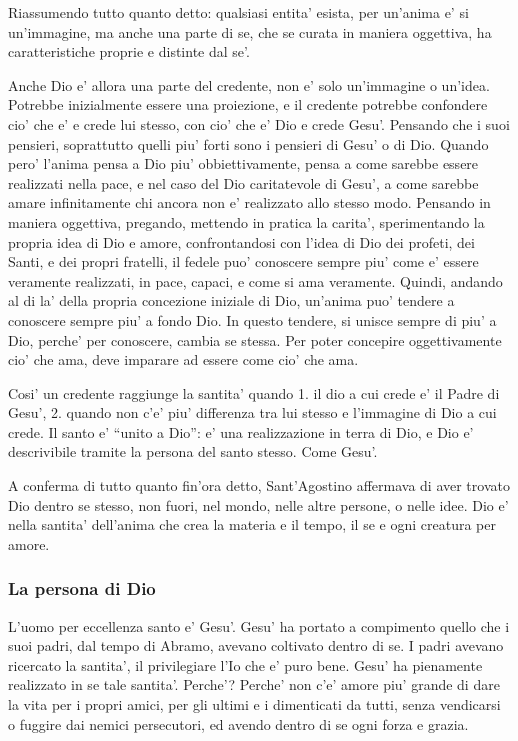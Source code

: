 Riassumendo tutto quanto detto: qualsiasi entita' esista, per un'anima e' si un'immagine, ma anche una parte di se, che se curata in maniera oggettiva, ha caratteristiche proprie e distinte dal se'.

Anche Dio e' allora una parte del credente, non e' solo un'immagine o un'idea. Potrebbe inizialmente essere una proiezione, e il credente potrebbe confondere cio' che e' e crede lui stesso, con cio' che e' Dio e crede Gesu'. Pensando che i suoi pensieri, soprattutto quelli piu' forti sono i pensieri di Gesu' o di Dio.
Quando pero' l'anima pensa a Dio piu' obbiettivamente, pensa a come sarebbe essere realizzati nella pace, e nel caso del Dio caritatevole di Gesu', a come sarebbe amare infinitamente chi ancora non e' realizzato allo stesso modo. Pensando in maniera oggettiva, pregando, mettendo in pratica la carita', sperimentando la propria idea di Dio e amore, confrontandosi con l'idea di Dio dei profeti, dei Santi, e dei propri fratelli, il fedele puo' conoscere sempre piu' come e' essere veramente realizzati, in pace, capaci, e come si ama veramente. Quindi, andando al di la' della propria concezione iniziale di Dio, un'anima puo' tendere a conoscere sempre piu' a fondo Dio. In questo tendere, si unisce sempre di piu' a Dio, perche' per conoscere, cambia se stessa. Per poter concepire oggettivamente cio' che ama, deve imparare ad essere come cio' che ama.

Cosi' un credente raggiunge la santita' quando 1. il dio a cui crede e' il Padre di Gesu', 2. quando non c'e' piu' differenza tra lui stesso e l'immagine di Dio a cui crede. Il santo e' ``unito a Dio'': e' una realizzazione in terra di Dio, e Dio e' descrivibile tramite la persona del santo stesso. Come Gesu'. 


A conferma di tutto quanto fin'ora detto, Sant'Agostino affermava di aver trovato Dio dentro se stesso, non fuori, nel mondo, nelle altre persone, o nelle idee. Dio e' nella santita' dell'anima che crea la materia e il tempo, il se e ogni creatura per amore.

\subsubsection{La persona di Dio}

L'uomo per eccellenza santo e' Gesu'. Gesu' ha portato a compimento quello che i suoi padri, dal tempo di Abramo, avevano coltivato dentro di se. I padri avevano ricercato la santita', il privilegiare l'Io che e' puro bene. Gesu' ha pienamente realizzato in se tale santita'. Perche'? Perche' non c'e' amore piu' grande di dare la vita per i propri amici, per gli ultimi e i dimenticati da tutti, senza vendicarsi o fuggire dai nemici persecutori, ed avendo dentro di se ogni forza e grazia.

